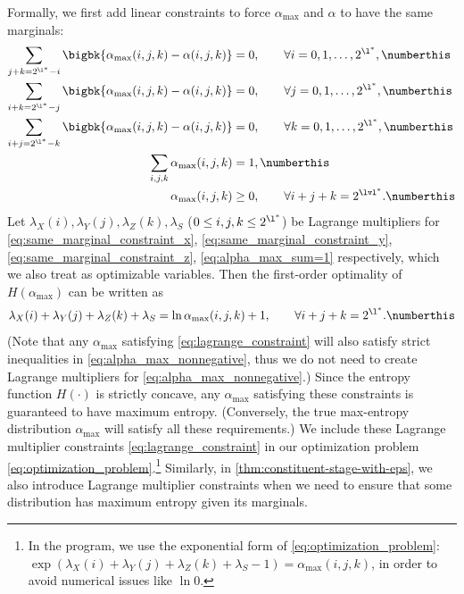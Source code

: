 Formally, we first add linear constraints to force $\alpha_{\max}$ and $\alpha$ to have the same marginals:
\begin{align*}
  \sum_{j + k = 2^{\l^*} - i} \bigbk{\alpha_{\max}(i,j,k) - \alpha(i,j,k)} &= 0, \qquad \forall i = 0, 1, \ldots, 2^{\l^*},
                                                  \numberthis \label{eq:same_marginal_constraint_x} \\
  \sum_{i + k = 2^{\l^*} - j} \bigbk{\alpha_{\max}(i,j,k) - \alpha(i,j,k)} &= 0, \qquad \forall j = 0, 1, \ldots, 2^{\l^*},
                                                  \numberthis \label{eq:same_marginal_constraint_y} \\
  \sum_{i + j = 2^{\l^*} - k} \bigbk{\alpha_{\max}(i,j,k) - \alpha(i,j,k)} &= 0, \qquad \forall k = 0, 1, \ldots, 2^{\l^*},
                                                  \numberthis \label{eq:same_marginal_constraint_z} \\
  \sum_{i,j,k} \alpha_{\max}(i,j,k) &= 1, \numberthis \label{eq:alpha_max_sum=1} \\
  \alpha_{\max}(i,j,k) &\ge 0, \qquad \forall i+j+k = 2^{\lvl^*}. \numberthis \label{eq:alpha_max_nonnegative}
\end{align*}
Let $\lambda_X(i), \lambda_Y(j), \lambda_Z(k), \lambda_S$ ($0 \le i, j, k \le 2^{\l^*}$) be Lagrange multipliers for \eqref{eq:same_marginal_constraint_x}, \eqref{eq:same_marginal_constraint_y}, \eqref{eq:same_marginal_constraint_z}, \eqref{eq:alpha_max_sum=1} respectively, which we also treat as optimizable variables. Then the first-order optimality of $H(\alpha_{\max})$ can be written as
\[
  \lambda_X(i) + \lambda_Y(j) + \lambda_Z(k) + \lambda_S = \ln \alpha_{\max}(i,j,k) + 1, \qquad \forall i + j + k = 2^{\l^*}. \numberthis \label{eq:lagrange_constraint}
\]
(Note that any $\alpha_{\max}$ satisfying \eqref{eq:lagrange_constraint} will also satisfy strict inequalities in \eqref{eq:alpha_max_nonnegative}, thus we do not need to create Lagrange multipliers for \eqref{eq:alpha_max_nonnegative}.)
Since the entropy function $H(\cdot)$ is strictly concave, any $\alpha_{\max}$ satisfying these constraints is guaranteed to have maximum entropy. (Conversely, the true max-entropy distribution $\alpha_{\max}$ will satisfy all these requirements.) We include these Lagrange multiplier constraints \eqref{eq:lagrange_constraint} in our optimization problem \eqref{eq:optimization_problem}.\footnote{In the program, we use the exponential form of \eqref{eq:optimization_problem}: $\exp(\lambda_X(i) + \lambda_Y(j) + \lambda_Z(k) + \lambda_S - 1) = \alpha_{\max}(i,j,k)$, in order to avoid numerical issues like $\ln 0$.} Similarly, in \cref{thm:constituent-stage-with-eps}, we also introduce Lagrange multiplier constraints when we need to ensure that some distribution has maximum entropy given its marginals.

